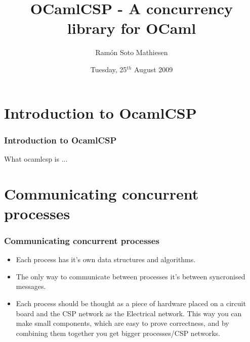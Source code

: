 \documentclass{beamer}
\title[OCamlCSP]{
  OCamlCSP - A concurrency library for OCaml
}
\author[Ramón Soto]{
  Ramón Soto Mathiesen
}
\institute{Computer Science Department \\ Copenhagen University}
\date{Tuesday, 25$^{th}$ August 2009}
\begin{document}
\begin{frame}
 \titlepage
\end{frame}


\section[Intro]{Introduction to OcamlCSP}
\begin{frame}
  \frametitle{Introduction to OcamlCSP}
  What ocamlcsp is ...
\end{frame}

\section[CSP]{Communicating concurrent processes}
\begin{frame}
  \frametitle{Communicating concurrent processes}
  \begin{itemize}
    \item Each process has it's own data structures and algorithms.
    \item The only way to communicate between processes it's between syncronised
      messages.
    \item Each process should be thought as a piece of hardware placed on a
      circuit board and the CSP network as the Electrical network. This way you
      can make small components, which are easy to prove correctness, and by
      combining them together you get bigger processes/CSP networks.
  \end{itemize}
\end{frame}
\end{document}
